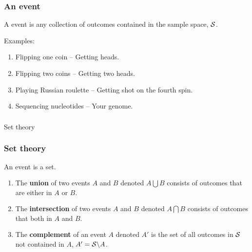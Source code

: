 \begin{frame}[fragile]\frametitle{An event}

\begin{defn}
A event is any collection of outcomes contained in the sample space,
$\cal S$.
\end{defn}


Examples:

\begin{enumerate}

\item Flipping one coin -- Getting heads. 

\item Flipping two coins -- Getting two heads. 

\item Playing Russian roulette  -- Getting shot on the fourth spin. 

\item Sequencing nucleotides -- Your genome.

\end{enumerate}
\end{frame}

\begin{frame}[fragile]\frametitle{}
\begin{center}
{\Large Set theory}

\end{center}
\end{frame}


\begin{frame}[fragile]\frametitle{Set theory}


An event is a set. \vspace{.1in}

\begin{defn}

\begin{enumerate}
\item The {\bf union} of two events $A$ and $B$  denoted $A \bigcup B$ 
  consists of outcomes that are either in $A$ or $B$.

\item The {\bf intersection} of two events $A$ and $B$ denoted $A \bigcap
  B$ consists of outcomes that both in $A$ and $B$.

\item The {\bf complement} of an event $A$ denoted $A'$ 
is the set of all outcomes in $\cal S$ not contained in $A$,
$A' = {\cal S} \backslash A$.
\end{enumerate}

\end{defn} 

\end{frame}

